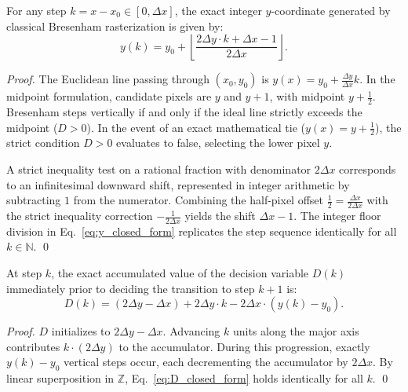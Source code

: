 \documentclass[runningheads]{llncs}
\begin{document}
\begin{lemma}
\label{lem:pixel_coord}
For any step $k = x - x_0 \in [0, \Delta x]$, the exact integer $y$-coordinate generated by classical Bresenham rasterization is given by:
\begin{equation}
    \label{eq:y_closed_form}
    y(k) = y_0 + \left\lfloor \frac{2\Delta y \cdot k + \Delta x - 1}{2\Delta x} \right\rfloor.
\end{equation}
\end{lemma}

\begin{proof}
The Euclidean line passing through $(x_0, y_0)$ is $y(x) = y_0 + \frac{\Delta y}{\Delta x}k$. In the midpoint formulation, candidate pixels are $y$ and $y+1$, with midpoint $y + \frac{1}{2}$. Bresenham steps vertically if and only if the ideal line strictly exceeds the midpoint ($D > 0$). In the event of an exact mathematical tie ($y(x) = y + \frac{1}{2}$), the strict condition $D > 0$ evaluates to false, selecting the lower pixel $y$. 

A strict inequality test on a rational fraction with denominator $2\Delta x$ corresponds to an infinitesimal downward shift, represented in integer arithmetic by subtracting $1$ from the numerator. Combining the half-pixel offset $\frac{1}{2} = \frac{\Delta x}{2\Delta x}$ with the strict inequality correction $-\frac{1}{2\Delta x}$ yields the shift $\Delta x - 1$. The integer floor division in Eq.~\eqref{eq:y_closed_form} replicates the step sequence identically for all $k \in \mathbb{N}$. \qed
\end{proof}

\begin{lemma}
\label{lem:error_state}
At step $k$, the exact accumulated value of the decision variable $D(k)$ immediately prior to deciding the transition to step $k+1$ is:
\begin{equation}
    \label{eq:D_closed_form}
    D(k) = (2\Delta y - \Delta x) + 2\Delta y \cdot k - 2\Delta x \cdot (y(k) - y_0).
\end{equation}
\end{lemma}

\begin{proof}
$D$ initializes to $2\Delta y - \Delta x$. Advancing $k$ units along the major axis contributes $k \cdot (2\Delta y)$ to the accumulator. During this progression, exactly $y(k) - y_0$ vertical steps occur, each decrementing the accumulator by $2\Delta x$. By linear superposition in $\mathbb{Z}$, Eq.~\eqref{eq:D_closed_form} holds identically for all $k$. \qed
\end{proof}
\end{document}
